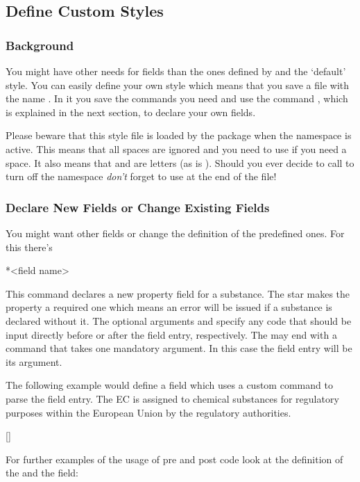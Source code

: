 \documentclass[DIV10,toc=index,toc=bib]{cnpkgdoc}
\begin{document}
\subsection{Define Custom Styles}\label{ssec:styles}
\subsubsection{Background}
You might have other needs for fields than the ones defined by \substances and
the `default' style. You can easily define your own style which means that you
save a file with the name . In it you save the
commands you need and use the command , which is
explained in the next section, to declare your own fields.

Please beware that this style file is loaded by the package when the 
namespace is active. This means that all spaces are ignored and you need to use
\code{\textasciitilde} if you need a space. It also means that \code{\_} and
\code{:} are letters (as is ). Should you ever decide to
call  to turn off the  namespace \emph{don't} forget
to use  at the end of the file!

\subsubsection{Declare New Fields or Change Existing Fields}
You might want other fields or change the definition of the predefined ones.
For this there's
\begin{beschreibung}
 *{<field name>}
\end{beschreibung}
This command declares a new property field for a substance. The star makes the
property a required one which means an error will be issued if a substance is
declared without it. The optional arguments  and 
specify any code that should be input directly before or after the field entry,
respectively. The  may end with a command that takes one mandatory
argument. In this case the field entry will be its argument.

The following example would define a field  which uses a custom command
to parse the field entry. The \ac{EC} is assigned to chemical substances
for regulatory purposes within the European Union by the regulatory authorities.
\begin{beispiel}
 \makeatletter
 \def\@EC#1-#2-#3{#1-#2-#3}
 \newcommand*\EC[1]{\@EC#1}
 \makeatother
 [\EC]
\end{beispiel}
For further examples of the usage of pre and post code look at the definition of
the  and the  field:
\end{document}
